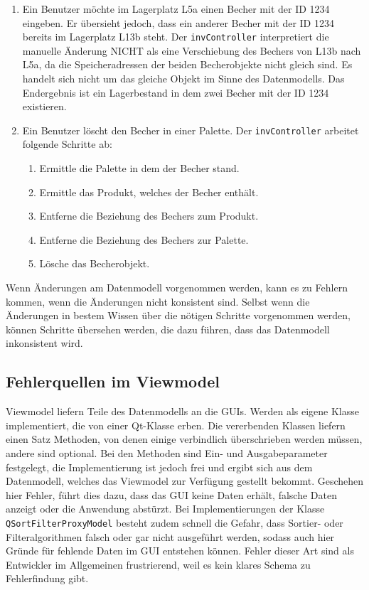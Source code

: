 \begin{enumerate}
    \item Ein Benutzer möchte im Lagerplatz L5a einen Becher mit der ID 1234 eingeben. 
    Er übersieht jedoch, dass ein anderer Becher mit der ID 1234 bereits im Lagerplatz L13b steht.
    Der \verb|invController| interpretiert die manuelle Änderung NICHT als eine Verschiebung des Bechers von L13b nach L5a, 
    da die Speicheradressen der beiden Becherobjekte nicht gleich sind. 
    Es handelt sich nicht um das gleiche Objekt im Sinne des Datenmodells.
    Das Endergebnis ist ein Lagerbestand in dem zwei Becher mit der ID 1234 existieren.
    \item Ein Benutzer löscht den Becher in einer Palette. 
    Der \verb|invController| arbeitet folgende Schritte ab: 
    \begin{enumerate}
        \item Ermittle die Palette in dem der Becher stand.
        \item Ermittle das Produkt, welches der Becher enthält.
        \item Entferne die Beziehung des Bechers zum Produkt.
        \item Entferne die Beziehung des Bechers zur Palette.
        \item Lösche das Becherobjekt.
    \end{enumerate}
\end{enumerate}

Wenn Änderungen am Datenmodell vorgenommen werden, kann es zu Fehlern kommen, wenn die Änderungen nicht konsistent sind.
Selbst wenn die Änderungen in bestem Wissen über die nötigen Schritte vorgenommen werden, können Schritte übersehen werden, 
die dazu führen, dass das Datenmodell inkonsistent wird.

\subsection{Fehlerquellen im Viewmodel}

Viewmodel liefern Teile des Datenmodells an die GUIs. Werden als eigene Klasse implementiert, die von einer Qt-Klasse erben.
Die vererbenden Klassen liefern einen Satz Methoden, von denen einige verbindlich überschrieben werden müssen, andere sind optional. 
Bei den Methoden sind Ein- und Ausgabeparameter festgelegt, die Implementierung ist jedoch frei und ergibt sich aus dem Datenmodell,
welches das Viewmodel zur Verfügung gestellt bekommt.
Geschehen hier Fehler, führt dies dazu, dass das GUI keine Daten erhält, falsche Daten anzeigt oder die Anwendung abstürzt.
Bei Implementierungen der Klasse \verb|QSortFilterProxyModel| besteht zudem schnell die Gefahr, dass Sortier- oder Filteralgorithmen
falsch oder gar nicht ausgeführt werden, sodass auch hier Gründe für fehlende Daten im GUI entstehen können.
Fehler dieser Art sind als Entwickler im Allgemeinen frustrierend, weil es kein klares Schema zu Fehlerfindung gibt.

